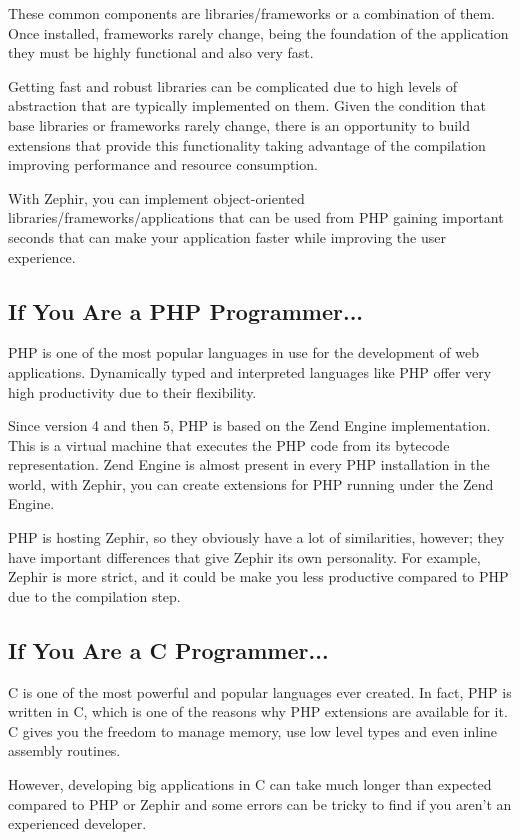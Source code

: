 \documentclass[letterpaper,10pt,english]{sphinxmanual}
\begin{document}
These common components are libraries/frameworks or a combination of them. Once installed, frameworks rarely
change, being the foundation of the application they must be highly functional and also very fast.

Getting fast and robust libraries can be complicated due to high levels of abstraction that are
typically implemented on them. Given the condition that base libraries or frameworks rarely change,
there is an opportunity to build extensions that provide this functionality taking advantage of the
compilation improving performance and resource consumption.

With Zephir, you can implement object-oriented libraries/frameworks/applications that can be used from
PHP gaining important seconds that can make your application faster while improving the user experience.


\subsection{If You Are a PHP Programmer...}
\label{motivation:if-you-are-a-php-programmer}
PHP is one of the most popular languages in use for the development of web applications.
Dynamically typed and interpreted languages like PHP offer very high productivity due to their flexibility.

Since version 4 and then 5, PHP is based on the Zend Engine implementation. This is a virtual machine
that executes the PHP code from its bytecode representation. Zend Engine is almost present in every
PHP installation in the world, with Zephir, you can create extensions for PHP running under the
Zend Engine.

PHP is hosting Zephir, so they obviously have a lot of similarities, however; they have
important differences that give Zephir its own personality. For example, Zephir is more strict,
and it could be make you less productive compared to PHP due to the compilation step.


\subsection{If You Are a C Programmer...}
\label{motivation:if-you-are-a-c-programmer}
C is one of the most powerful and popular languages ever created. In fact, PHP is written in C,
which is one of the reasons why PHP extensions are available for it. C gives you the freedom to
manage memory, use low level types and even inline assembly routines.

However, developing big applications in C can take much longer than expected compared to PHP or Zephir
and some errors can be tricky to find if you aren't an experienced developer.
\end{document}
